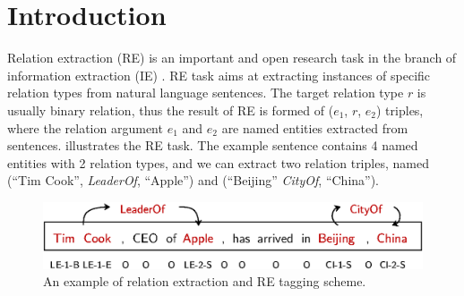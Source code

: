 \section{Introduction}

Relation extraction (RE) \cite{Bach} is an important and open 
research task in the branch of information extraction (IE) \cite{Grishman1997}.
RE task aims at extracting instances of specific relation types from natural language sentences.
The target relation type $r$ is usually binary relation, 
thus the result of RE is formed of ($e_1$, $r$, $e_2$) triples,
where the relation argument $e_1$ and $e_2$ are named entities extracted from sentences.
 illustrates the RE task.
The example sentence contains 4 named entities with 2 relation types,
and we can extract two relation triples, named
(``Tim Cook'', \textit{LeaderOf}, ``Apple'') and (``Beijing'' \textit{CityOf}, ``China'').
\begin{figure}[th]
  \centering
  \includegraphics[width=\columnwidth]{pictures/introduction.eps}
  \caption{An example of relation extraction and RE tagging scheme.}
  \label{fig:intro}
\end{figure}

